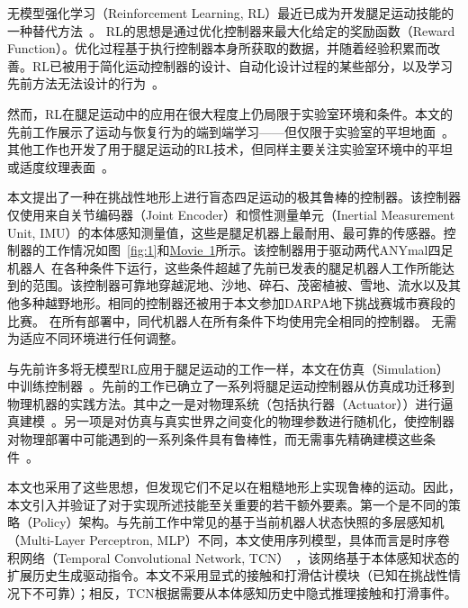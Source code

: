 \documentclass[9pt,twocolumn,twoside]{osajnl}
\begin{document}
无模型强化学习（Reinforcement Learning, RL）最近已成为开发腿足运动技能的一种替代方法~\cite{hwangbo2019learning,haarnoja2018learning,xie2019iterative}。
RL的思想是通过优化控制器来最大化给定的奖励函数（Reward Function）。优化过程基于执行控制器本身所获取的数据，并随着经验积累而改善。RL已被用于简化运动控制器的设计、自动化设计过程的某些部分，以及学习先前方法无法设计的行为~\cite{hwangbo2019learning,lee2019robust,haarnoja2018learning,xie2019iterative}。

然而，RL在腿足运动中的应用在很大程度上仍局限于实验室环境和条件。本文的先前工作展示了运动与恢复行为的端到端学习——但仅限于实验室的平坦地面~\cite{hwangbo2019learning}。其他工作也开发了用于腿足运动的RL技术，但同样主要关注实验室环境中的平坦或适度纹理表面~\cite{tan2018sim,haarnoja2018learning,xie2019iterative,yang2019data,ha2020learning,Peng2020}。

本文提出了一种在挑战性地形上进行盲态四足运动的极其鲁棒的控制器。该控制器仅使用来自关节编码器（Joint Encoder）和惯性测量单元（Inertial Measurement Unit, IMU）的本体感知测量值，这些是腿足机器上最耐用、最可靠的传感器。控制器的工作情况如图~\ref{fig:1}和\href{https://youtu.be/9j2a1oAHDL8}{Movie~1}所示。该控制器用于驱动两代ANYmal四足机器人~\cite{hutter2016anymal}在各种条件下运行，这些条件超越了先前已发表的腿足机器人工作所能达到的范围。该控制器可靠地穿越泥地、沙地、碎石、茂密植被、雪地、流水以及其他多种越野地形。相同的控制器还被用于本文参加DARPA地下挑战赛城市赛段的比赛。
在所有部署中，同代机器人在所有条件下均使用完全相同的控制器。
无需为适应不同环境进行任何调整。

与先前许多将无模型RL应用于腿足运动的工作一样，本文在仿真（Simulation）中训练控制器~\cite{hwangbo2019learning,tan2018sim,xie2019iterative}。先前的工作已确立了一系列将腿足运动控制器从仿真成功迁移到物理机器的实践方法。其中之一是对物理系统（包括执行器（Actuator））进行逼真建模~\cite{hwangbo2019learning}。另一项是对仿真与真实世界之间变化的物理参数进行随机化，使控制器对物理部署中可能遇到的一系列条件具有鲁棒性，而无需事先精确建模这些条件~\cite{peng2018sim}。

本文也采用了这些思想，但发现它们不足以在粗糙地形上实现鲁棒的运动。因此，本文引入并验证了对于实现所述技能至关重要的若干额外要素。第一个是不同的策略（Policy）架构。与先前工作中常见的基于当前机器人状态快照的多层感知机（Multi-Layer Perceptron, MLP）不同，本文使用序列模型，具体而言是时序卷积网络（Temporal Convolutional Network, TCN）~\cite{bai2018empirical}，该网络基于本体感知状态的扩展历史生成驱动指令。本文不采用显式的接触和打滑估计模块（已知在挑战性情况下不可靠）；相反，TCN根据需要从本体感知历史中隐式推理接触和打滑事件。
\end{document}

